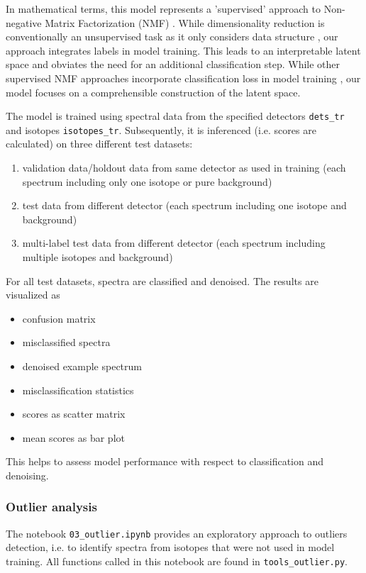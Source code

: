 \documentclass[preprint,12pt, a4paper]{elsarticle}
\begin{document}
In mathematical terms, this model represents a 'supervised' approach to Non-negative Matrix Factorization (NMF) \cite{Shreeves2020, Bilton2019}. 
While dimensionality reduction is conventionally an unsupervised task as it 
only considers data structure \cite{Olaya2022}, our approach integrates labels in model training. This leads to an interpretable latent space and obviates the need for an additional classification step. While other supervised NMF approaches incorporate classification loss in model training \cite{Leuschner2019, Lee2010, Bisot2016}, our model focuses on a comprehensible construction of the latent space. 


The model is trained using spectral data from the specified detectors \texttt{dets\_tr} and isotopes \texttt{isotopes\_tr}. Subsequently, it is inferenced (i.e. scores are calculated) on three different test datasets:
\begin{enumerate}
\item validation data/holdout data from same detector as used in training (each spectrum including 
only one isotope or pure background)
\item test data from different detector (each spectrum including one isotope and background)
\item multi-label test data from different detector (each spectrum including multiple isotopes and background)
\end{enumerate}


For all test datasets, spectra are classified and denoised. The results are visualized as 
\begin{itemize}
\item confusion matrix  
\item misclassified spectra  
\item denoised example spectrum  
\item misclassification statistics  
\item scores as scatter matrix  
\item mean scores as bar plot
\end{itemize}
  
This helps to assess model performance with respect to classification and denoising. 

\subsubsection{Outlier analysis}
The notebook \texttt{03\_outlier.ipynb} provides an exploratory approach to outliers detection, i.e. to identify spectra from isotopes that were not used in model training. All functions called in this notebook are found in \texttt{tools\_outlier.py}. 
\end{document}
